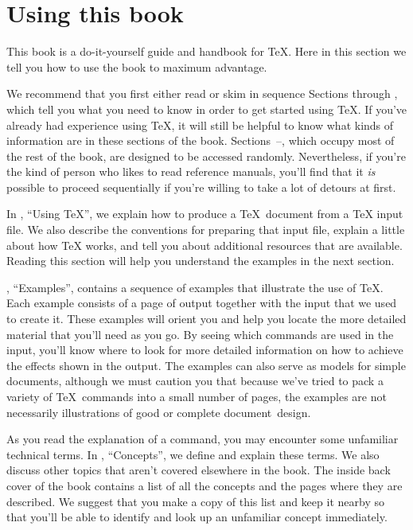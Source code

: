 

\chapter{Using this book}


This book is a do-it-yourself guide and handbook for \TeX. 
Here in this section we tell you how to use the book to maximum advantage.

We recommend that you first either read or skim in sequence Sections
 through ,
which tell you what you need to know in order to get started using \TeX.
If you've already had experience using \TeX, it will still be helpful
to know what kinds of information are in these sections of the book.
Sections~--, which
occupy most of
the rest of the book, are designed to be accessed randomly.
Nevertheless, if you're the kind of person who likes to read reference manuals,
you'll find that it \emph{is} possible to proceed sequentially if you're
willing to take a lot of detours at first.

In , ``Using \TeX'',
we explain how to produce a \TeX\ document from a
\TeX{} input file.
We also describe the conventions for preparing that input file,
explain a little about how \TeX{} works, and tell you about additional
resources that are available.
Reading this section will help you understand
the examples in the next section.

, ``Examples'',
contains a sequence of 
examples that illustrate the use of \TeX.
Each example consists of a page of output
together with the input that we used to create it.
These examples will orient you and help you 
locate the more detailed material that you'll need as you go.  
By seeing which commands are used in the input, you'll know
where to look for more detailed information on how to achieve
the effects shown in the output.
The
examples can also serve as models for simple documents, although we must
caution you that 
because we've tried to pack a variety of \TeX\ commands into a small
number of pages,  
the examples are not necessarily illustrations of good or complete 
document~design.

As you read the explanation of a command, you may encounter
some unfamiliar technical terms.
In , ``Concepts'',
we define and explain these terms.
We also discuss other topics that aren't covered
elsewhere in the book.
The inside back cover of the book contains a list of all the
concepts and the pages where they are described.
We suggest that you make a copy of this list and keep it nearby
so that you'll be able to identify and look up an unfamiliar
concept immediately.


